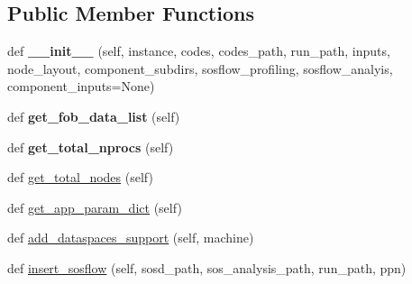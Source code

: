 \subsection*{Public Member Functions}
\begin{DoxyCompactItemize}
\item 
\mbox{\label{classcodar_1_1cheetah_1_1model_1_1_run_a6329bdbb131c9c7e621a3177f7066fc9}} 
def {\bfseries \+\_\+\+\_\+init\+\_\+\+\_\+} (self, instance, codes, codes\+\_\+path, run\+\_\+path, inputs, node\+\_\+layout, component\+\_\+subdirs, sosflow\+\_\+profiling, sosflow\+\_\+analyis, component\+\_\+inputs=None)
\item 
\mbox{\label{classcodar_1_1cheetah_1_1model_1_1_run_a8d10cb20808cc4c66a59f949ec40aeb8}} 
def {\bfseries get\+\_\+fob\+\_\+data\+\_\+list} (self)
\item 
\mbox{\label{classcodar_1_1cheetah_1_1model_1_1_run_af56a27848d2d8b900435b462ac6b74d8}} 
def {\bfseries get\+\_\+total\+\_\+nprocs} (self)
\item 
def \hyperlink{classcodar_1_1cheetah_1_1model_1_1_run_ac75c0038a278def4dce9aaf37fbe1c70}{get\+\_\+total\+\_\+nodes} (self)
\item 
def \hyperlink{classcodar_1_1cheetah_1_1model_1_1_run_a30df1617b81f2cfcde9f57d443ca25cb}{get\+\_\+app\+\_\+param\+\_\+dict} (self)
\item 
def \hyperlink{classcodar_1_1cheetah_1_1model_1_1_run_a5fc7b380524cfda5c77104b61e4441fd}{add\+\_\+dataspaces\+\_\+support} (self, machine)
\item 
def \hyperlink{classcodar_1_1cheetah_1_1model_1_1_run_a8f4284bf79f8b909c4c2d0ef5319e3bc}{insert\+\_\+sosflow} (self, sosd\+\_\+path, sos\+\_\+analysis\+\_\+path, run\+\_\+path, ppn)
\end{DoxyCompactItemize}

